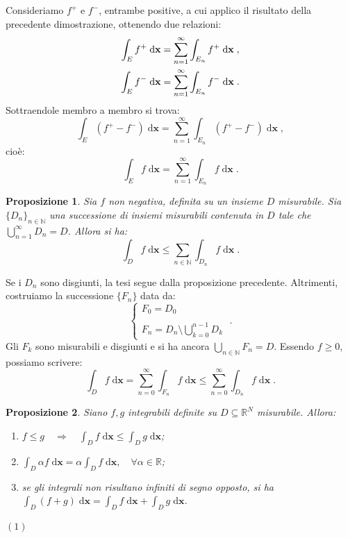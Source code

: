\documentclass[a4paper,12pt]{report}
\theoremstyle{plain}
\newtheorem{prop}{Proposizione}[section]
\theoremstyle{definition}
\theoremstyle{remark}
\newcommand{\diff}[1]{\mathrm{d}#1}
\numberwithin{equation}{section}
\begin{document}
Consideriamo $f^+$ e $f^-$, entrambe positive, a cui applico il risultato della precedente dimostrazione, ottenendo due relazioni:
\begin{align}
\int_E f^+\;\diff{\mathbf{x}} &=\sum_{n=1}^{\infty}\int_{E_n} f^+\;\diff{\mathbf{x}}\;, \notag \\
\int_E f^-\;\diff{\mathbf{x}} &=\sum_{n=1}^{\infty}\int_{E_n} f^-\;\diff{\mathbf{x}}\;.
\end{align}
Sottraendole membro a membro si trova:
\begin{equation}
\int_{E} (f^+-f^-)\;\diff{\mathbf{x}}=\sum_{n=1}^{\infty}\int_{E_n}(f^+-f^-)\;\diff{\mathbf{x}}\;,
\end{equation}
cioè:
\begin{equation}
\int_E f\;\diff{\mathbf{x}}=\sum_{n=1}^{\infty} \int_{E_n} f\;\diff{\mathbf{x}}\;.
\end{equation}
\endproof
\begin{prop} Sia $f$ non negativa, definita su un insieme $D$ misurabile. Sia $\{D_n\}_{n\in\mathbb{N}}$ una successione di insiemi misurabili contenuta in $D$ tale che $\bigcup_{n=1}^{\infty} D_n=D$. Allora si ha:
\begin{equation}
\int_D f\;\diff{\mathbf{x}}\le \sum_{n\in\mathbb{N}} \int_{D_n}f\;\diff{\mathbf{x}}\;.
\end{equation}
\end{prop}
\proof Se i $D_n$ sono disgiunti, la tesi segue dalla proposizione precedente. Altrimenti, costruiamo la successione $\{F_n\}$ data da:
\begin{equation}
\begin{cases}
 F_0=D_0 \\
\\
F_n=D_n\setminus \bigcup_{k=0}^{n-1} D_k
\end{cases}\;.
\end{equation}
Gli $F_k$ sono misurabili e disgiunti e si ha ancora $\bigcup_{n\in\mathbb{N}} F_n=D$. Essendo $f\ge 0$, possiamo scrivere:
\begin{equation}
\int_D f\;\diff{\mathbf{x}}=\sum_{n=0}^{\infty}\int_{F_n}f\;\diff{\mathbf{x}}\le \sum_{n=0}^{\infty} \int_{D_n} f\;\diff{\mathbf{x}}\;.
\end{equation}
\endproof
\begin{prop} Siano $f,g$ integrabili definite su $D\subseteq \mathbb{R}^N$ misurabile. Allora:
\begin{enumerate}
 \item $f\le g\quad \Longrightarrow\quad \int_D f\;\diff{\mathbf{x}}\le\int_D g\;\diff{\mathbf{x}}$;
 \item $\int_D \alpha f\;\diff{\mathbf{x}}=\alpha\int_D f\;\diff{\mathbf{x}},\quad \forall \alpha \in \mathbb{R}$;
 \item se gli integrali non risultano infiniti di segno opposto, si ha $\int_D (f+g)\;\diff{\mathbf{x}}=\int_D f\;\diff{\mathbf{x}}+\int_D g\;\diff{\mathbf{x}}$.
\end{enumerate}
\end{prop}
\proof $(1)$ \\
\end{document}
